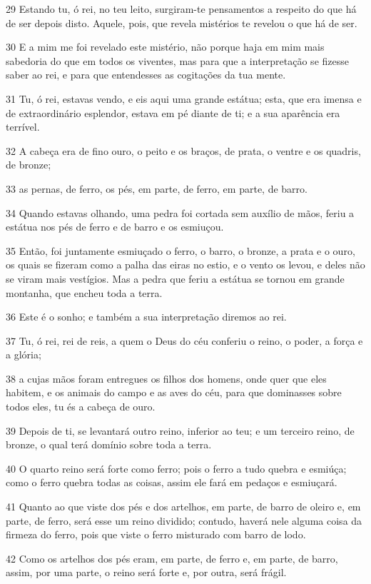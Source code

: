\par 29 Estando tu, ó rei, no teu leito, surgiram-te pensamentos a respeito do que há de ser depois disto. Aquele, pois, que revela mistérios te revelou o que há de ser.
\par 30 E a mim me foi revelado este mistério, não porque haja em mim mais sabedoria do que em todos os viventes, mas para que a interpretação se fizesse saber ao rei, e para que entendesses as cogitações da tua mente.
\par 31 Tu, ó rei, estavas vendo, e eis aqui uma grande estátua; esta, que era imensa e de extraordinário esplendor, estava em pé diante de ti; e a sua aparência era terrível.
\par 32 A cabeça era de fino ouro, o peito e os braços, de prata, o ventre e os quadris, de bronze;
\par 33 as pernas, de ferro, os pés, em parte, de ferro, em parte, de barro.
\par 34 Quando estavas olhando, uma pedra foi cortada sem auxílio de mãos, feriu a estátua nos pés de ferro e de barro e os esmiuçou.
\par 35 Então, foi juntamente esmiuçado o ferro, o barro, o bronze, a prata e o ouro, os quais se fizeram como a palha das eiras no estio, e o vento os levou, e deles não se viram mais vestígios. Mas a pedra que feriu a estátua se tornou em grande montanha, que encheu toda a terra.
\par 36 Este é o sonho; e também a sua interpretação diremos ao rei.
\par 37 Tu, ó rei, rei de reis, a quem o Deus do céu conferiu o reino, o poder, a força e a glória;
\par 38 a cujas mãos foram entregues os filhos dos homens, onde quer que eles habitem, e os animais do campo e as aves do céu, para que dominasses sobre todos eles, tu és a cabeça de ouro.
\par 39 Depois de ti, se levantará outro reino, inferior ao teu; e um terceiro reino, de bronze, o qual terá domínio sobre toda a terra.
\par 40 O quarto reino será forte como ferro; pois o ferro a tudo quebra e esmiúça; como o ferro quebra todas as coisas, assim ele fará em pedaços e esmiuçará.
\par 41 Quanto ao que viste dos pés e dos artelhos, em parte, de barro de oleiro e, em parte, de ferro, será esse um reino dividido; contudo, haverá nele alguma coisa da firmeza do ferro, pois que viste o ferro misturado com barro de lodo.
\par 42 Como os artelhos dos pés eram, em parte, de ferro e, em parte, de barro, assim, por uma parte, o reino será forte e, por outra, será frágil.
